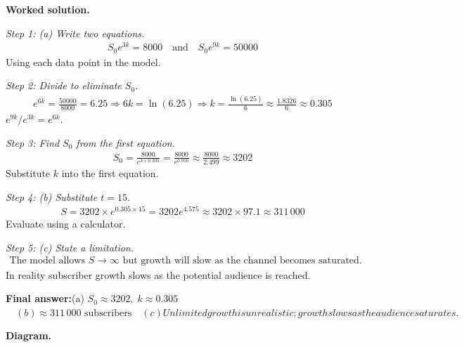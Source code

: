 \documentclass[11pt]{article}
\begin{document}
\textbf{Worked solution.}

\textit{Step 1: (a) Write two equations.}
\[\begin{gathered}
S_0 e^{3k} = 8000 \quad \text{and} \quad S_0 e^{9k} = 50000
\end{gathered}\]
Using each data point in the model.

\textit{Step 2: Divide to eliminate \( S_0 \).}
\[\begin{gathered}
e^{6k} = \frac{50000}{8000} = 6.25 \Rightarrow 6k = \ln(6.25) \Rightarrow k = \frac{\ln(6.25)}{6} \approx \frac{1.8326}{6} \approx 0.305
\end{gathered}\]
\( e^{9k}/e^{3k} = e^{6k} \).

\textit{Step 3: Find \( S_0 \) from the first equation.}
\[\begin{gathered}
S_0 = \frac{8000}{e^{3 \times 0.305}} = \frac{8000}{e^{0.916}} \approx \frac{8000}{2.499} \approx 3202
\end{gathered}\]
Substitute \( k \) into the first equation.

\textit{Step 4: (b) Substitute \( t = 15 \).}
\[\begin{gathered}
S = 3202 \times e^{0.305 \times 15} = 3202 e^{4.575} \approx 3202 \times 97.1 \approx 311\,000
\end{gathered}\]
Evaluate using a calculator.

\textit{Step 5: (c) State a limitation.}
\[\begin{gathered}
\text{The model allows } S \to \infty \text{ but growth will slow as the channel becomes saturated.}
\end{gathered}\]
In reality subscriber growth slows as the potential audience is reached.

\begin{answerbox}
\textbf{Final answer:}\quad (a) \(\displaystyle  S_0 \approx 3202, \; k \approx 0.305 \)\(\displaystyle  \quad  (b) \approx 311\,000 \text{ subscribers} \quad  (c) Unlimited growth is unrealistic; growth slows as the audience saturates.\)
\end{answerbox}
\textbf{Diagram.}
\end{document}
